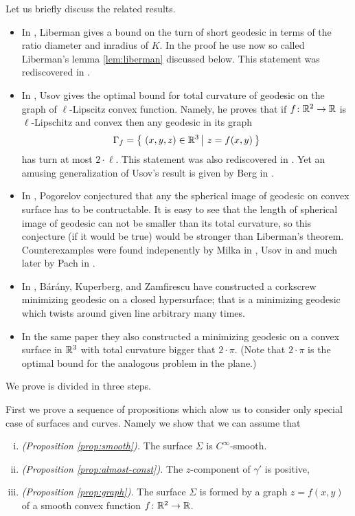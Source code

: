 \documentclass[a4paper,10pt]{amsart}
\begin{document}
Let us briefly discuss the related results.

\begin{itemize}
\item In \cite{liberman}, Liberman gives a bound on the turn of short geodesic in terms of the ratio diameter and inradius of $K$.
In the proof he use now so called Liberman's lemma \ref{lem:liberman} discussed below.
This statement was rediscovered in \cite{BKZ}.
\item In \cite{usov}, 
Usov gives the optimal bound for total curvature of geodesic on the graph of $\ell$-Lipscitz convex function. 
Namely, he proves that if $f\colon\mathbb{R}^2\to\mathbb{R}$ is $\ell$-Lipschitz and convex then any 
geodesic in its graph 
\[\Gamma_f=\set{(x,y,z)\in \RR^3}{z=f(x,y)}\] 
has turn at most $2\cdot \ell$.
This statement was also rediscovered in \cite{BKZ}.
Yet an amusing generalization of Usov's result is given by Berg in \cite{berg}.
\item In \cite{pogorelov}, Pogorelov conjectured that any the spherical image of geodesic on convex surface has to be contructable.
It is easy to see that the length of spherical image of geodesic can not be smaller than its total curvature, 
so this conjecture (if it would be true) 
would be stronger than Liberman's theorem.
Counterexamples were found indepenently by Milka in \cite{milka}, 
Usov in \cite{usov-conj-pog} 
and much later by Pach in \cite{pach}.
\item In \cite{BKZ},
B{\'a}r{\'a}ny,
Kuperberg, 
and Zamfirescu 
have constructed a corkscrew minimizing geodesic on a closed hypersurface;
that is a minimizing geodesic which twists around given line arbitrary many times.

\item In the same paper they also constructed a minimizing geodesic on a convex surface in $\mathbb{R}^3$
with total curvature bigger that $2\cdot\pi$.
(Note that $2\cdot\pi$ is the optimal bound for the analogous problem in the plane.)
\end{itemize}

We prove is divided in three steps.

First we prove a sequence of propositions which alow us to consider only special case of surfaces and curves.
Namely we show that we can assume that
\begin{enumerate}[(i)]
\item\label{smooth}{\it (Proposition \ref{prop:smooth}).} 
The surface $\Sigma$ is $C^\infty$-smooth.
\item{\it (Proposition \ref{prop:almost-const}).}  The $z$-component of $\gamma'$ is positive,
\item\label{graph}{\it (Proposition \ref{prop:graph}).} The surface $\Sigma$ is formed by a graph $z=f(x,y)$ of a smooth convex function $f\colon\mathbb{R}^2\to \mathbb{R}$.
\end{enumerate}
\end{document}
